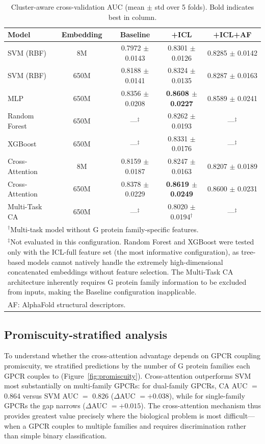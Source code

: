 \documentclass[11pt,a4paper]{article}
\begin{document}
\begin{table}[ht]
\centering
\caption{Cluster-aware cross-validation AUC (mean $\pm$ std over 5 folds). Bold indicates best in column.}
\label{tab:main}
\begin{tabular}{lcccc}
\toprule
Model & Embedding & Baseline & +ICL & +ICL+AF \\
\midrule
SVM (RBF)       & 8M   & 0.7972 $\pm$ 0.0143 & 0.8301 $\pm$ 0.0126 & 0.8285 $\pm$ 0.0142 \\
SVM (RBF)       & 650M & 0.8188 $\pm$ 0.0141 & 0.8324 $\pm$ 0.0135 & 0.8287 $\pm$ 0.0163 \\
MLP             & 650M & 0.8356 $\pm$ 0.0208 & \textbf{0.8608 $\pm$ 0.0227} & 0.8589 $\pm$ 0.0241 \\
Random Forest   & 650M & ---$^\ddagger$      & 0.8262 $\pm$ 0.0193 & ---$^\ddagger$ \\
XGBoost        & 650M & ---$^\ddagger$      & 0.8331 $\pm$ 0.0176 & ---$^\ddagger$ \\
Cross-Attention & 8M   & 0.8159 $\pm$ 0.0187 & 0.8247 $\pm$ 0.0163 & 0.8207 $\pm$ 0.0189 \\
Cross-Attention & 650M & 0.8378 $\pm$ 0.0229 & \textbf{0.8619 $\pm$ 0.0249} & 0.8600 $\pm$ 0.0231 \\
Multi-Task CA   & 650M & ---$^\ddagger$      & 0.8020 $\pm$ 0.0194$^\dagger$ & ---$^\ddagger$ \\
\bottomrule
\multicolumn{5}{l}{\small $^\dagger$Multi-task model without G protein family-specific features.} \\
\multicolumn{5}{l}{\small $^\ddagger$Not evaluated in this configuration. Random Forest and XGBoost were tested only with the ICL-full feature set (the most informative configuration), as tree-based models cannot natively handle the extremely high-dimensional concatenated embeddings without feature selection. The Multi-Task CA architecture inherently requires G protein family information to be excluded from inputs, making the Baseline configuration inapplicable.} \\
\multicolumn{5}{l}{\small AF: AlphaFold structural descriptors.}
\end{tabular}
\end{table}

\subsection{Promiscuity-stratified analysis}

To understand whether the cross-attention advantage depends on GPCR coupling promiscuity, we stratified predictions by the number of G protein families each GPCR couples to (Figure~\ref{fig:promiscuity}). Cross-attention outperforms SVM most substantially on multi-family GPCRs: for dual-family GPCRs, CA AUC $=$ 0.864 versus SVM AUC $=$ 0.826 ($\Delta$AUC $= +0.038$), while for single-family GPCRs the gap narrows ($\Delta$AUC $= +0.015$). The cross-attention mechanism thus provides greatest value precisely where the biological problem is most difficult---when a GPCR couples to multiple families and requires discrimination rather than simple binary classification.
\end{document}
